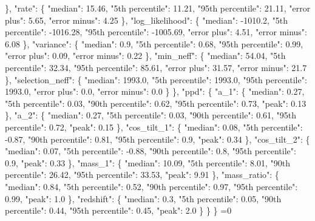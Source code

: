 {{        \}, %
        "rate": \{%
          "median": 15.46, %
          "5th percentile": 11.21, %
          "95th percentile": 21.11, %
          "error plus": 5.65, %
          "error minus": 4.25%
        \}, %
        "log\_likelihood": \{%
          "median": {-}1010.2, %
          "5th percentile": {-}1016.28, %
          "95th percentile": {-}1005.69, %
          "error plus": 4.51, %
          "error minus": 6.08%
        \}, %
        "variance": \{%
          "median": 0.9, %
          "5th percentile": 0.68, %
          "95th percentile": 0.99, %
          "error plus": 0.09, %
          "error minus": 0.22%
        \}, %
        "min\_neff": \{%
          "median": 54.04, %
          "5th percentile": 32.34, %
          "95th percentile": 85.61, %
          "error plus": 31.57, %
          "error minus": 21.7%
        \}, %
        "selection\_neff": \{%
          "median": 1993.0, %
          "5th percentile": 1993.0, %
          "95th percentile": 1993.0, %
          "error plus": 0.0, %
          "error minus": 0.0%
        \}%
      \}, %
      "ppd": \{%
        "a\_1": \{%
          "median": 0.27, %
          "5th percentile": 0.03, %
          "90th percentile": 0.62, %
          "95th percentile": 0.73, %
          "peak": 0.13%
        \}, %
        "a\_2": \{%
          "median": 0.27, %
          "5th percentile": 0.03, %
          "90th percentile": 0.61, %
          "95th percentile": 0.72, %
          "peak": 0.15%
        \}, %
        "cos\_tilt\_1": \{%
          "median": 0.08, %
          "5th percentile": {-}0.87, %
          "90th percentile": 0.81, %
          "95th percentile": 0.9, %
          "peak": 0.34%
        \}, %
        "cos\_tilt\_2": \{%
          "median": 0.07, %
          "5th percentile": {-}0.88, %
          "90th percentile": 0.8, %
          "95th percentile": 0.9, %
          "peak": 0.33%
        \}, %
        "mass\_1": \{%
          "median": 10.09, %
          "5th percentile": 8.01, %
          "90th percentile": 26.42, %
          "95th percentile": 33.53, %
          "peak": 9.91%
        \}, %
        "mass\_ratio": \{%
          "median": 0.84, %
          "5th percentile": 0.52, %
          "90th percentile": 0.97, %
          "95th percentile": 0.99, %
          "peak": 1.0%
        \}, %
        "redshift": \{%
          "median": 0.3, %
          "5th percentile": 0.05, %
          "90th percentile": 0.44, %
          "95th percentile": 0.45, %
          "peak": 2.0%
        \}%
      \}%
    \}}%
  \else%
    \ifnum{}=0%
      \def\MagTruncnormIndTiltIsotropicTruncnormNnd@out{%
}}

